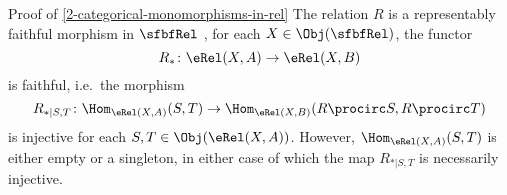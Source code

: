\begin{Proof}{Proof of \cref{2-categorical-monomorphisms-in-rel}}%
    The relation $R$ is a representably faithful morphism in $\sfbfRel$ \textiff, for each $X\in\Obj(\sfbfRel)$, the functor
    \[
        R_{*}%
        \colon%
        \eRel(X,A)%
        \to%
        \eRel(X,B)%
    \]%
    is faithful, i.e.\ \textiff the morphism
    \[
        R_{*|S,T}%
        \colon%
        \Hom_{\eRel(X,A)}(S,T)%
        \to%
        \Hom_{\eRel(X,B)}(R\procirc S,R\procirc T)%
    \]%
    is injective for each $S,T\in\Obj(\eRel(X,A))$. However, $\Hom_{\eRel(X,A)}(S,T)$ is either empty or a singleton, in either case of which the map $R_{*|S,T}$ is necessarily injective.


\end{Proof}
